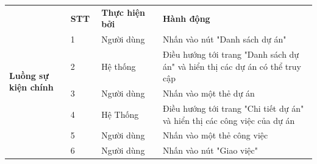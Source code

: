 \documentclass[../DoAn.tex]{subfiles}
\begin{document}
\begin{table}[ht]
\begin{tabular}{| p{0.2\linewidth} | p{0.1\linewidth} | p{0.2\linewidth} | p{0.5\linewidth} |}
        \multirow{12}{\linewidth}{\textbf{Luồng sự kiện chính}}      & \multicolumn{1}{p{0.1\linewidth}|}{\textbf{STT}}                                                   & \multicolumn{1}{p{0.2\linewidth}|}{\textbf{Thực hiện bởi}} & \multicolumn{1}{p{0.5\linewidth}|}{\textbf{Hành động}}                                                                         \\ \cline{2-4}
                                                                     & \multicolumn{1}{p{0.1\linewidth}|}{1}                                                              & \multicolumn{1}{p{0.2\linewidth}|}{Người dùng}             & \multicolumn{1}{p{0.5\linewidth}|}{Nhấn vào nút "Danh sách dự án"}                                                             \\ \cline{2-4}
                                                                     & \multicolumn{1}{p{0.1\linewidth}|}{2}                                                              & \multicolumn{1}{p{0.2\linewidth}|}{Hệ thống}               & \multicolumn{1}{p{0.5\linewidth}|}{Điều hướng tới trang "Danh sách dự án" và hiển thị các dự án có thể truy cập}               \\ \cline{2-4}
                                                                     & \multicolumn{1}{p{0.1\linewidth}|}{3}                                                              & \multicolumn{1}{p{0.2\linewidth}|}{Người dùng}             & \multicolumn{1}{p{0.5\linewidth}|}{Nhấn vào một thẻ dự án}                                                                     \\ \cline{2-4}
                                                                     & \multicolumn{1}{p{0.1\linewidth}|}{4}                                                              & \multicolumn{1}{p{0.2\linewidth}|}{Hệ Thống}               & \multicolumn{1}{p{0.5\linewidth}|}{Điều hướng tới trang "Chi tiết dự án" và hiển thị các công việc của dự án}                  \\ \cline{2-4}
                                                                     & \multicolumn{1}{p{0.1\linewidth}|}{5}                                                              & \multicolumn{1}{p{0.2\linewidth}|}{Người dùng}             & \multicolumn{1}{p{0.5\linewidth}|}{Nhấn vào một thẻ công việc}                                                                 \\ \cline{2-4}
                                                                     & \multicolumn{1}{p{0.1\linewidth}|}{6}                                                              & \multicolumn{1}{p{0.2\linewidth}|}{Người dùng}             & \multicolumn{1}{p{0.5\linewidth}|}{Nhấn vào nút "Giao việc"}                                                                   \\ \cline{2-4}

\end{tabular}
\end{table}
\end{document}
